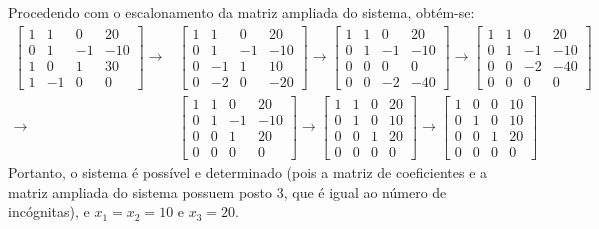 \documentclass[12pt,a4paper]{article}
\begin{document}
\begin{ExerciseList}
Procedendo com o escalonamento da matriz ampliada do sistema, obtém-se:
{\footnotesize
\begin{align*}
\begin{bmatrix}
 1 &  1 &  0 &  20 \\
 0 &  1 & -1 & -10 \\
 1 &  0 &  1 &  30 \\
 1 & -1 &  0 &   0
\end{bmatrix}
\rightarrow
& \begin{bmatrix}
 1 &  1 &  0 &  20 \\
 0 &  1 & -1 & -10 \\
 0 & -1 &  1 &  10 \\
 0 & -2 &  0 & -20
\end{bmatrix}
\rightarrow
\begin{bmatrix}
 1 &  1 &  0 &  20 \\
 0 &  1 & -1 & -10 \\
 0 &  0 &  0 &   0 \\
 0 &  0 & -2 & -40
\end{bmatrix}
\rightarrow
\begin{bmatrix}
 1 &  1 &  0 &  20 \\
 0 &  1 & -1 & -10 \\
 0 &  0 & -2 & -40 \\
 0 &  0 &  0 &   0
\end{bmatrix} \\
\rightarrow
&\begin{bmatrix}
 1 &  1 &  0 &  20 \\
 0 &  1 & -1 & -10 \\
 0 &  0 &  1 &  20 \\
 0 &  0 &  0 &   0
\end{bmatrix}
\rightarrow
\begin{bmatrix}
 1 &  1 &  0 &  20 \\
 0 &  1 &  0 &  10 \\
 0 &  0 &  1 &  20 \\
 0 &  0 &  0 &   0
\end{bmatrix}
\rightarrow
\begin{bmatrix}
 1 &  0 &  0 &  10 \\
 0 &  1 &  0 &  10 \\
 0 &  0 &  1 &  20 \\
 0 &  0 &  0 &   0
\end{bmatrix}
\end{align*}
}
Portanto, o sistema é possível e determinado (pois a matriz de coeficientes e a matriz ampliada do sistema possuem posto 3, que é igual ao número de incógnitas), e $x_1 = x_2 = 10$ e $x_3 = 20$.


\end{ExerciseList}
\end{document}
